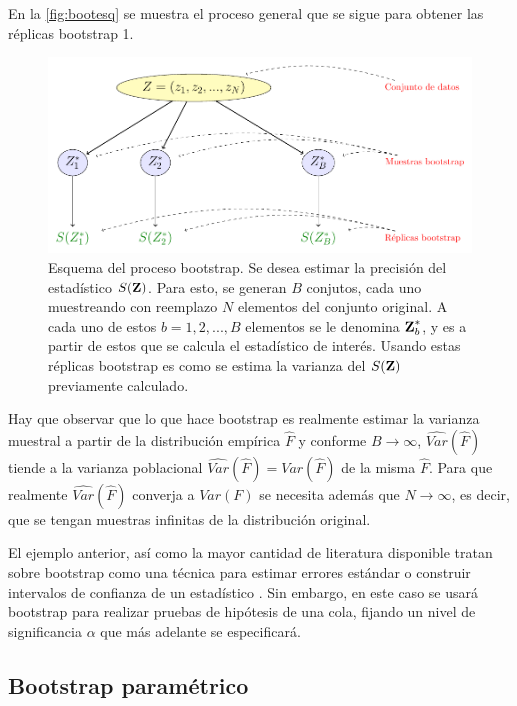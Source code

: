 En la \autoref{fig:bootesq} se muestra el proceso general que se sigue para obtener las réplicas bootstrap \cite{Hastie2001}1.

\begin{figure}[tp]
  \centerline
  {\includegraphics[width=1.1\linewidth]{gfx/chap4/untitled}}        
  \caption[Esquema del proceso bootstrap.]{Esquema del proceso bootstrap. Se desea estimar la precisión del estadístico $S(\textbf{Z})$. Para esto, se generan $B$ conjutos, cada uno muestreando con reemplazo $N$ elementos del conjunto original. A cada uno de estos $b = 1, 2, ..., B$ elementos se le denomina $\textbf{Z}^{*}_b$, y es a partir de estos que se calcula el estadístico de interés. Usando estas réplicas bootstrap es como se estima la varianza del $S(\textbf{Z})$ previamente calculado.}
  \label{fig:bootesq}
\end{figure}

Hay que observar que lo que hace bootstrap es realmente estimar la varianza muestral a partir de la distribución empírica $\hat F$ y conforme $B \rightarrow \infty$, $\widehat{Var}(\hat F)$ tiende a la varianza poblacional $\widehat{Var}(\hat F) = {Var}(\hat F)$ de la misma $\hat F$. Para que realmente $\widehat{Var}(\hat F)$ converja a  ${Var}(F)$ se necesita además que $N \rightarrow \infty$, es decir, que se tengan muestras infinitas de la distribución original.

El ejemplo anterior, así como la mayor cantidad de literatura disponible tratan sobre bootstrap como una técnica para estimar errores estándar o construir intervalos de confianza de un estadístico \cite{MacKinnon2007}. Sin embargo, en este caso se usará bootstrap para realizar pruebas de hipótesis de una cola, fijando un nivel de significancia $\alpha$ que más adelante se especificará.

\subsection{Bootstrap paramétrico}

